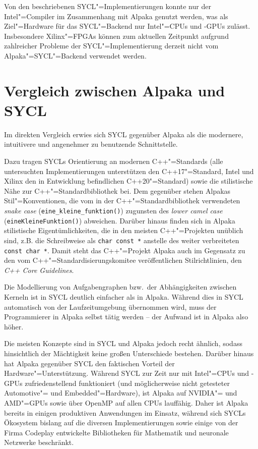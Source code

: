 Von den beschriebenen SYCL"=Implementierungen konnte nur der Intel"=Compiler im
Zusammenhang mit Alpaka genutzt werden, was als Ziel"=Hardware für das
SYCL"=Backend nur Intel"=CPUs und -GPUs zulässt. Insbesondere Xilinx"=FPGAs
können zum aktuellen Zeitpunkt aufgrund zahlreicher Probleme der
SYCL"=Implementierung derzeit nicht vom Alpaka"=SYCL"=Backend verwendet werden.

\section{Vergleich zwischen Alpaka und SYCL}

Im direkten Vergleich erwies sich SYCL gegenüber Alpaka als die modernere,
intuitivere und angenehmer zu benutzende Schnittstelle.

Dazu tragen SYCLs Orientierung an modernen C++"=Standards (alle untersuchten
Implementierungen unterstützen den C++17"=Standard, Intel und Xilinx den in
Entwicklung befindlichen C++20"=Standard) sowie die stilistische Nähe zur
C++"=Standardbibliothek bei. Dem gegenüber stehen Alpakas Stil"=Konventionen,
die vom in der C++"=Standardbibliothek verwendeten \textit{snake case}
(\texttt{eine\_kleine\_funktion()}) zugunsten des
\textit{lower camel case} (\texttt{eineKleineFunktion()}) abweichen. Darüber
hinaus finden sich in Alpaka stilistische Eigentümlichkeiten, die in den meisten
C++"=Projekten unüblich sind, z.B. die Schreibweise als \texttt{char const *}
anstelle des weiter verbreiteten \texttt{const char *}. Damit steht das
C++"=Projekt Alpaka auch im Gegensatz zu den vom C++"=Standardisierungskomitee
veröffentlichen Stilrichtlinien, den \textit{C++ Core Guidelines}.

Die Modellierung von Aufgabengraphen bzw.\ der Abhängigkeiten zwischen Kerneln
ist in SYCL deutlich einfacher als in Alpaka. Während dies in SYCL automatisch
von der Laufzeitumgebung übernommen wird, muss der Programmierer in Alpaka
selbst tätig werden -- der Aufwand ist in Alpaka also höher.

Die meisten Konzepte sind in SYCL und Alpaka jedoch recht ähnlich, sodass
hinsichtlich der Mächtigkeit keine großen Unterschiede bestehen. Darüber hinaus
hat Alpaka gegenüber SYCL den faktischen Vorteil der Hardware"=Unterstützung.
Während SYCL zur Zeit nur mit Intel"=CPUs und -GPUs zufriedenstellend
funktioniert (und möglicherweise nicht getesteter Automotive"= und
Embedded"=Hardware), ist Alpaka auf NVIDIA"= und AMD"=GPUs sowie über OpenMP auf
allen CPUs lauffähig. Daher ist Alpaka bereits in einigen produktiven
Anwendungen im Einsatz, während sich SYCLs Ökosystem bislang auf die diversen
Implementierungen sowie einige von der Firma Codeplay entwickelte Bibliotheken
für Mathematik und neuronale Netzwerke beschränkt. 

